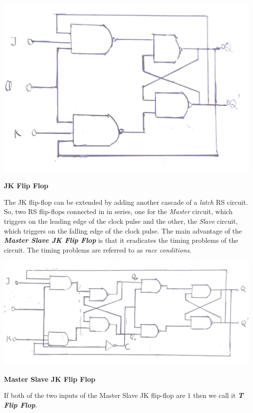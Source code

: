 \begin{center}
    \includegraphics[scale = 0.16]{Documents/jkff_1.jpg}
\end{center}
\begin{center}
    \textbf{JK Flip Flop}
\end{center}
The JK flip-flop can be extended by adding another cascade of a \emph{latch} RS circuit. So, two RS flip-flops connected in in series, one for the \emph{Master} circuit, which triggers on the leading edge of the clock pulse and the other, the \emph{Slave} circuit, which triggers on the falling edge of the clock pulse. The main advantage of the \textbf{\emph{Master Slave JK Flip Flop}} is that it eradicates the timing problems of the circuit. The timing problems are referred to as \emph{race conditions}.
\begin{center}
    \includegraphics[scale = 0.2]{Documents/msjkff_1.jpg}
\end{center}
\begin{center}
    \textbf{Master Slave JK Flip Flop}
\end{center}
If both of the two inputs of the Master Slave JK flip-flop are $1$ then we call it \textbf{\emph{T Flip Flop}}.

